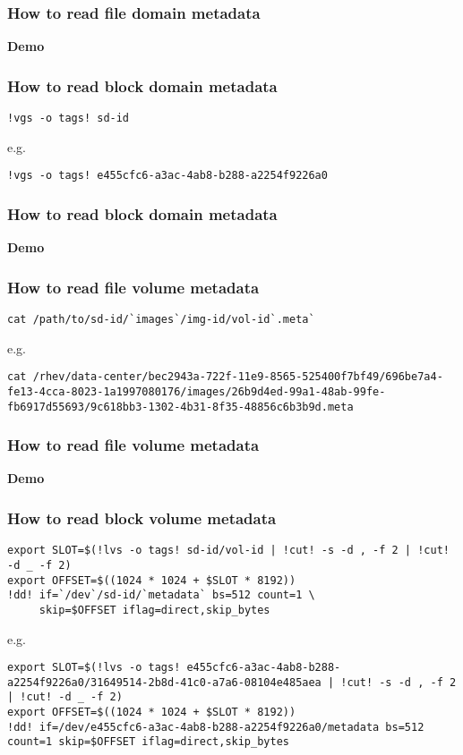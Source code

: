 \documentclass[10pt,utf8]{beamer}
\begin{document}
\begin{frame}
	\frametitle{How to read file domain metadata}
	\centering
	\huge{\textbf{Demo}}
\end{frame}

\begin{frame}[fragile]
	\frametitle{How to read block domain metadata}
	\begin{lstlisting}[style=Bash]
!vgs -o tags! sd-id
	\end{lstlisting}

	\vspace{0.5cm}
	e.g.
	\vspace{0.5cm}

	\begin{lstlisting}[style=Bash]
!vgs -o tags! e455cfc6-a3ac-4ab8-b288-a2254f9226a0
	\end{lstlisting}
\end{frame}

\begin{frame}
  \frametitle{How to read block domain metadata}
	\centering
	\huge{\textbf{Demo}}
\end{frame}

\begin{frame}[fragile]
	\frametitle{How to read file volume metadata}
	\begin{lstlisting}[style=Bash]
cat /path/to/sd-id/`images`/img-id/vol-id`.meta`
	\end{lstlisting}

	\vspace{0.5cm}
	e.g.
	\vspace{0.5cm}

\begin{lstlisting}[style=Bash]
cat /rhev/data-center/bec2943a-722f-11e9-8565-525400f7bf49/696be7a4-fe13-4cca-8023-1a1997080176/images/26b9d4ed-99a1-48ab-99fe-fb6917d55693/9c618bb3-1302-4b31-8f35-48856c6b3b9d.meta 
	\end{lstlisting}
\end{frame}

\begin{frame}
  \frametitle{How to read file volume metadata}
	\centering
	\huge{\textbf{Demo}}
\end{frame}

\begin{frame}[fragile]
	\frametitle{How to read block volume metadata}
	\begin{lstlisting}[style=Bash]
export SLOT=$(!lvs -o tags! sd-id/vol-id | !cut! -s -d , -f 2 | !cut! -d _ -f 2)
export OFFSET=$((1024 * 1024 + $SLOT * 8192))
!dd! if=`/dev`/sd-id/`metadata` bs=512 count=1 \
	 skip=$OFFSET iflag=direct,skip_bytes
	\end{lstlisting}

	e.g.

	\begin{lstlisting}[style=Bash]
export SLOT=$(!lvs -o tags! e455cfc6-a3ac-4ab8-b288-a2254f9226a0/31649514-2b8d-41c0-a7a6-08104e485aea | !cut! -s -d , -f 2 | !cut! -d _ -f 2)
export OFFSET=$((1024 * 1024 + $SLOT * 8192))
!dd! if=/dev/e455cfc6-a3ac-4ab8-b288-a2254f9226a0/metadata bs=512 count=1 skip=$OFFSET iflag=direct,skip_bytes
	\end{lstlisting}
\end{frame}
\end{document}
